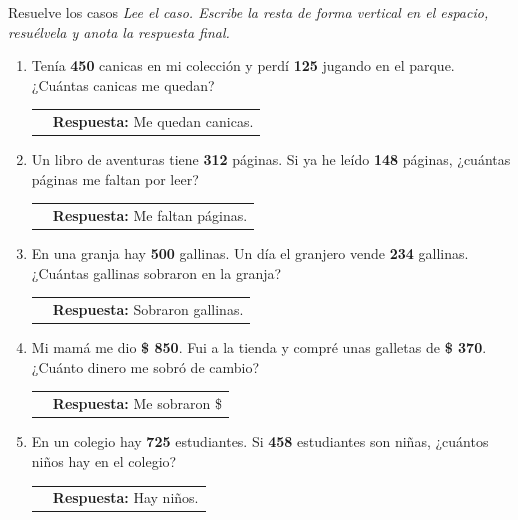 \documentclass[12pt, letterpaper]{article}
\newcommand{\boxfill}[1][1.2cm]{\tcbox[on line, size=minimal, colframe=valdark!80, colback=white, boxrule=0.5pt, arc=1mm, boxsep=2pt, left=2pt, right=2pt, top=2pt, bottom=2pt]{\makebox[#1]{\vphantom{M}}}}
\begin{document}
	\begin{practica}{Resuelve los casos }
		\textit{Lee el caso. Escribe la resta de forma vertical en el espacio, resuélvela y anota la respuesta final.}
		
		\vspace{0.4cm}
		\begin{enumerate}[itemsep=1.5cm]
			\item Tenía \textbf{450} canicas en mi colección y perdí \textbf{125} jugando en el parque. ¿Cuántas canicas me quedan? \\
			\begin{tabular}{c c}
				\makebox[5cm]{ \boxfill[3cm] } & \textbf{Respuesta:} Me quedan \boxfill[1.5cm] canicas.
			\end{tabular}
			
			\item Un libro de aventuras tiene \textbf{312} páginas. Si ya he leído \textbf{148} páginas, ¿cuántas páginas me faltan por leer? \\
			\begin{tabular}{c c}
				\makebox[5cm]{ \boxfill[3cm] } & \textbf{Respuesta:} Me faltan \boxfill[1.5cm] páginas.
			\end{tabular}
			
			\item En una granja hay \textbf{500} gallinas. Un día el granjero vende \textbf{234} gallinas. ¿Cuántas gallinas sobraron en la granja? \\
			\begin{tabular}{c c}
				\makebox[5cm]{ \boxfill[3cm] } & \textbf{Respuesta:} Sobraron \boxfill[1.5cm] gallinas.
			\end{tabular}
			
			\item Mi mamá me dio \textbf{\$ 850}. Fui a la tienda y compré unas galletas de \textbf{\$ 370}. ¿Cuánto dinero me sobró de cambio? \\
			\begin{tabular}{c c}
				\makebox[5cm]{ \boxfill[3cm] } & \textbf{Respuesta:} Me sobraron \$ \boxfill[1.5cm]
			\end{tabular}
			
			\item En un colegio hay \textbf{725} estudiantes. Si \textbf{458} estudiantes son niñas, ¿cuántos niños hay en el colegio? \\
			\begin{tabular}{c c}
				\makebox[5cm]{ \boxfill[3cm] } & \textbf{Respuesta:} Hay \boxfill[1.5cm] niños.
			\end{tabular}
			

\end{enumerate}
\end{practica}
\end{document}

